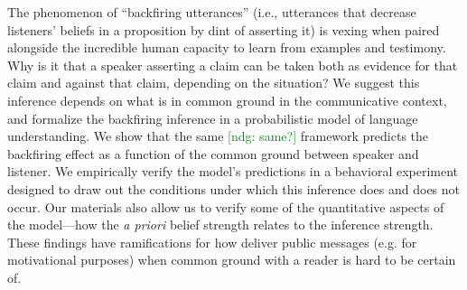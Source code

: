 \documentclass[10pt,letterpaper]{article}
\newcommand{\red}[1]{\textcolor{Red}{#1}}
\newcommand{\ndg}[1]{\textcolor{Green}{[ndg: #1]}}
\newcommand{\mht}[1]{\textcolor{Blue}{[mht: #1]}}
\begin{document}
%




The phenomenon of ``backfiring utterances'' (i.e., utterances that decrease listeners' beliefs in a proposition by dint of asserting it) is vexing when paired alongside the incredible human capacity to learn from examples and testimony. 
Why is it that a speaker asserting a claim can be taken both as evidence for that claim and against that claim, depending on the situation? 
We suggest this inference depends on what is in common ground in the communicative context, and formalize the backfiring inference in a probabilistic model of language understanding.
We show that the same \ndg{same?} framework predicts the backfiring effect as a function of the common ground between speaker and listener.
We empirically verify the model's predictions in a behavioral experiment designed to draw out the conditions under which this inference does and does not occur. 
Our materials also allow us to verify some of the quantitative aspects of the model---how the \emph{a priori} belief strength relates to the inference strength.
These findings have ramifications for how deliver public messages (e.g. for motivational purposes) when common ground with a reader is hard to be certain of. 

\end{document}
